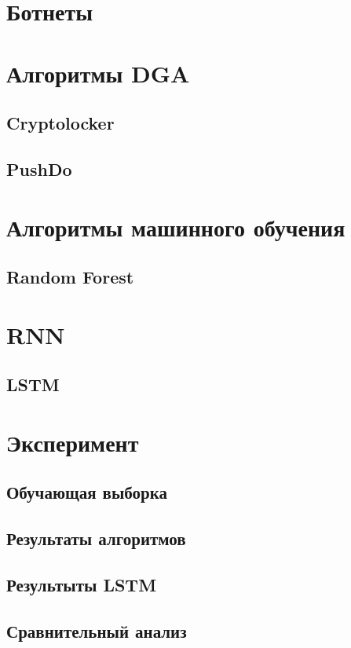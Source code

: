 \section{Ботнеты}

\section{Алгоритмы DGA}
\subsection{Cryptolocker}
\subsection{PushDo}

\section{Алгоритмы машинного обучения}
\subsection{Random Forest}
\section{RNN}
\subsection{LSTM}

\section{Эксперимент}
\subsection{Обучающая выборка}
\subsection{Результаты алгоритмов}
\subsection{Результыты LSTM}
\subsection{Сравнительный анализ}


\clearpage
